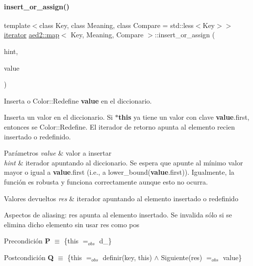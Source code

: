 \paragraph{\texorpdfstring{insert\+\_\+or\+\_\+assign()}{insert\_or\_assign()}\hspace{0.1cm}{\footnotesize\ttfamily [1/2]}}
{\footnotesize\ttfamily template$<$class Key, class Meaning, class Compare = std\+::less$<$\+Key$>$$>$ \\
\hyperlink{classaed2_1_1map_1_1iterator}{iterator} \hyperlink{classaed2_1_1map}{aed2\+::map}$<$ Key, Meaning, Compare $>$\+::insert\+\_\+or\+\_\+assign (\begin{DoxyParamCaption}\item[{\hyperlink{classaed2_1_1map_1_1const__iterator}{const\+\_\+iterator}}]{hint,  }\item[{const \hyperlink{classaed2_1_1map_a719db98e0ff9a837610f76be33264680_a719db98e0ff9a837610f76be33264680}{value\+\_\+type} \&}]{value }\end{DoxyParamCaption})\hspace{0.3cm}{\ttfamily [inline]}}



Inserta o Color\+::\+Redefine {\bfseries value} en el diccionario. 

Inserta un valor en el diccionario. Si {\bfseries $\ast$this} ya tiene un valor con clave {\bfseries value}.first, entonces se Color\+::\+Redefine. El iterador de retorno apunta al elemento recien insertado o redefinido.


\begin{DoxyParams}{Parámetros}
{\em value} & valor a insertar \\
\hline
{\em hint} & iterador apuntando al diccionario. Se espera que apunte al mínimo valor mayor o igual a {\bfseries value}.first (i.\+e., a lower\+\_\+bound({\bfseries value}.first)). Igualmente, la función es robusta y funciona correctamente aunque esto no ocurra. \\
\hline
\end{DoxyParams}

\begin{DoxyRetVals}{Valores devueltos}
{\em res} & iterador apuntando al elemento insertado o redefinido\\
\hline
\end{DoxyRetVals}
\begin{DoxyParagraph}{Aspectos de aliasing\+:}
res apunta al elemento insertado. Se invalida sólo si se elimina dicho elemento sin usar res como pos
\end{DoxyParagraph}
\begin{DoxyPrecond}{Precondición}
{\bfseries P} $\equiv$ \{this $=_{obs}$ d\+\_\} 
\end{DoxyPrecond}
\begin{DoxyPostcond}{Postcondición}
{\bfseries Q} $\equiv$ \{this $=_{obs}$ definir(key, this) $\land$ Siguiente(res) $=_{obs}$ value\}
\end{DoxyPostcond}

